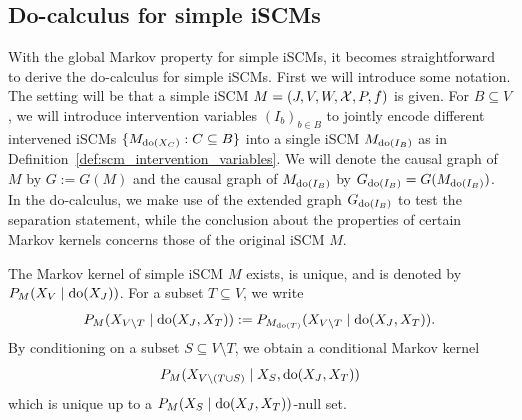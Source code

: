 \subsection{Do-calculus for simple iSCMs}\label{sec:scms_do-calculus}


With the global Markov property for simple iSCMs, it becomes straightforward to derive the do-calculus for simple iSCMs.
First we will introduce some notation. 
The setting will be that a simple iSCM $M = \left ( J, V, W, \mathcal{X}, P, f \right )$ is given. 
For $B \subseteq V$, we will introduce intervention variables $(I_b)_{b \in B}$ to jointly encode different intervened iSCMs $\{M_{\operatorname{do}(X_C)} : C \subseteq B\}$ into a single iSCM $M_{\operatorname{do}(I_B)}$ as in Definition~\ref{def:scm_intervention_variables}.
We will denote the causal graph of $M$ by $G := G(M)$ and the causal graph of $M_{\operatorname{do}(I_B)}$ by $G_{\operatorname{do}(I_B)} = G(M_{\operatorname{do}(I_B)})$.
In the do-calculus, we make use of the extended graph $G_{\operatorname{do}(I_B)}$ to test the separation statement, while the conclusion
about the properties of certain Markov kernels concerns those of the original iSCM $M$.

The Markov kernel of simple iSCM $M$ exists, is unique, and is denoted by $P_{M}(X_V \mid \operatorname{do}(X_J))$.
For a subset $T \subseteq V$, we write 
$$P_{M}(X_{V\setminus T} \mid \operatorname{do}(X_J,X_T)) := P_{M_{\operatorname{do}(T)}}(X_{V\setminus T} \mid \operatorname{do}(X_J,X_T)).$$
By conditioning on a subset $S \subseteq V \setminus T$, we obtain a conditional Markov kernel
$$P_{M}(X_{V\setminus (T \cup S)} \mid X_S, \operatorname{do}(X_J,X_T))$$
which is unique up to a $P_M(X_S \mid \operatorname{do}(X_J,X_T))$-null set.

